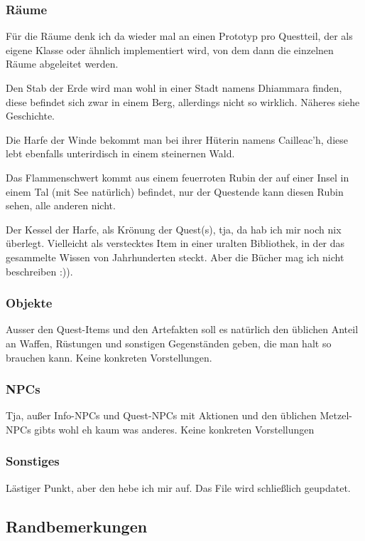 \documentclass[10pt,a4paper,oneside,onecolumn]{article}
\begin{document}
\subsubsection{Räume}

Für die Räume denk ich da wieder mal an einen Prototyp pro Questteil,
der als eigene Klasse oder ähnlich implementiert wird, von dem dann
die einzelnen Räume abgeleitet werden.

Den Stab der Erde wird man wohl in einer Stadt namens Dhiammara finden,
diese befindet sich zwar in einem Berg, allerdings nicht so wirklich.
Näheres siehe Geschichte.

Die Harfe der Winde bekommt man bei ihrer Hüterin namens Cailleac'h,
diese lebt ebenfalls unterirdisch in einem steinernen Wald.

Das Flammenschwert kommt aus einem feuerroten Rubin der auf einer
Insel in einem Tal (mit See natürlich) befindet, nur der Questende
kann diesen Rubin sehen, alle anderen nicht.

Der Kessel der Harfe, als Krönung der Quest(s), tja, da hab ich mir
noch nix überlegt. Vielleicht als verstecktes Item in einer uralten
Bibliothek, in der das gesammelte Wissen von Jahrhunderten steckt.
Aber die Bücher mag ich nicht beschreiben :)).


\subsubsection{Objekte}

Ausser den Quest-Items und den Artefakten soll es natürlich den üblichen
Anteil an Waffen, Rüstungen und sonstigen Gegenständen geben, die
man halt so brauchen kann. Keine konkreten Vorstellungen.


\subsubsection{NPCs}

Tja, außer Info-NPCs und Quest-NPCs mit Aktionen und den üblichen
Metzel-NPCs gibts wohl eh kaum was anderes. Keine konkreten Vorstellungen


\subsubsection{Sonstiges}

Lästiger Punkt, aber den hebe ich mir auf. Das File wird schließlich
geupdatet.


\subsection{Randbemerkungen}
\end{document}
